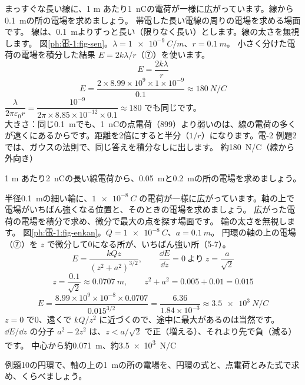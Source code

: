 \label{ph:電-1:ex9}
\begin{phreidai}[長い線の電荷の電場]
まっすぐな長い線に、1 m あたり\qty{1}{nC}の電荷が一様に広がっています。線から\qty{0.1}{m}の所の電場を求めましょう。
\phbamen
帯電した長い電線の周りの電場を求める場面です。
\phmushi
線は、\qty{0.1}{m}よりずっと長い（限りなく長い）とします。線の太さを無視します。
\phzu
図\ref{ph:電-1:fig-sen}。$\lambda=\qty{1e-9}{C/m}$、$r=\qty{0.1}{m}$。
\phriyu
小さく分けた電荷の電場を積分した結果 $E=2k\lambda/r$（⑦）を使います。
\phtateru
\[E=\frac{2k\lambda}{r}\]
\phtoku
\[E=\frac{2\times8.99\times10^9\times1\times10^{-9}}{0.1}\approx\qty{180}{N/C}\]
\phtashikame
$\dfrac{\lambda}{2\pi\varepsilon_0r}=\dfrac{10^{-9}}{2\pi\times8.85\times10^{-12}\times0.1}\approx180$ でも同じです。\\
大きさ：同じ\qty{0.1}{m}でも、\qty{1}{nC}の点電荷（899）より弱いのは、線の電荷の多くが遠くにあるからです。距離を2倍にすると半分（$1/r$）になります。電-2 例題2 では、ガウスの法則で、同じ答えを積分なしに出します。
\kotae 約\qty{180}{N/C}（線から外向き）
\end{phreidai}
\begin{jibun}
1 m あたり\qty{2}{nC}の長い線電荷から、\qty{0.05}{m}と\qty{0.2}{m}の所の電場を求めましょう。
\end{jibun}

\label{ph:電-1:ex10}
\begin{phreidai}
半径\qty{0.1}{m}の細い輪に、$\qty{1e-8}{C}$ の電荷が一様に広がっています。軸の上で電場がいちばん強くなる位置と、そのときの電場を求めましょう。
\phbamen
広がった電荷の電場を積分で求め、微分で最大の点を探す場面です。
\phmushi
輪の太さを無視します。
\phzu
図\ref{ph:電-1:fig-enkan}。$Q=\qty{1e-8}{C}$、$a=\qty{0.1}{m}$。
\phriyu
円環の軸の上の電場（⑦）を $z$ で微分して0になる所が、いちばん強い所（5-7）。
\phtateru
\[E=\frac{kQz}{(z^2+a^2)^{3/2}},\qquad\frac{\dd E}{\dd z}=0\ \text{より}\ z=\frac{a}{\sqrt2}\]
\phtoku
\[z=\frac{0.1}{\sqrt2}\approx\qty{0.0707}{m},\qquad z^2+a^2=0.005+0.01=0.015\]
\[E=\frac{8.99\times10^9\times10^{-8}\times0.0707}{0.015^{3/2}}=\frac{6.36}{1.84\times10^{-3}}\approx\qty{3.5e3}{N/C}\]
\phtashikame
$z=0$ で0、遠くで $kQ/z^2$ に近づくので、途中に最大があるのは当然です。$\dd E/\dd z$ の分子 $a^2-2z^2$ は、$z<a/\sqrt2$ で正（増える）、それより先で負（減る）です。
\kotae 中心から約\qty{0.071}{m}、約\qty{3.5e3}{N/C}
\end{phreidai}
\begin{jibun}
例題10の円環で、軸の上の\qty{1}{m}の所の電場を、円環の式と、点電荷とみた式で求め、くらべましょう。
\end{jibun}

